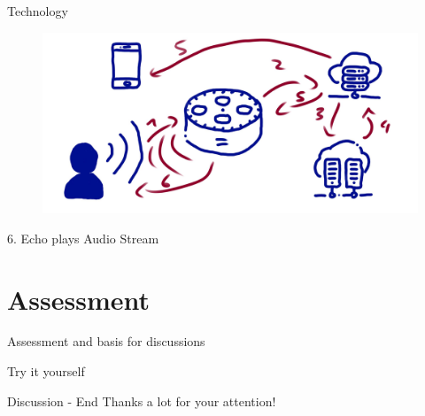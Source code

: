 \documentclass[aspectratio=169]{beamer}
\begin{document}
\begin{frame}{Technology}
\begin{figure}
	\includegraphics[width=0.9\linewidth]{images/alexatech}
\end{figure}
6. Echo plays Audio Stream
\end{frame}



\section{Assessment}
\begin{frame}{Assessment and basis for discussions}
\end{frame}

\begin{frame}{Try it yourself}
\end{frame}

\begin{frame}{Discussion - End}
	\centering
	\huge{Thanks a lot for your attention!}
\end{frame}
\end{document}
